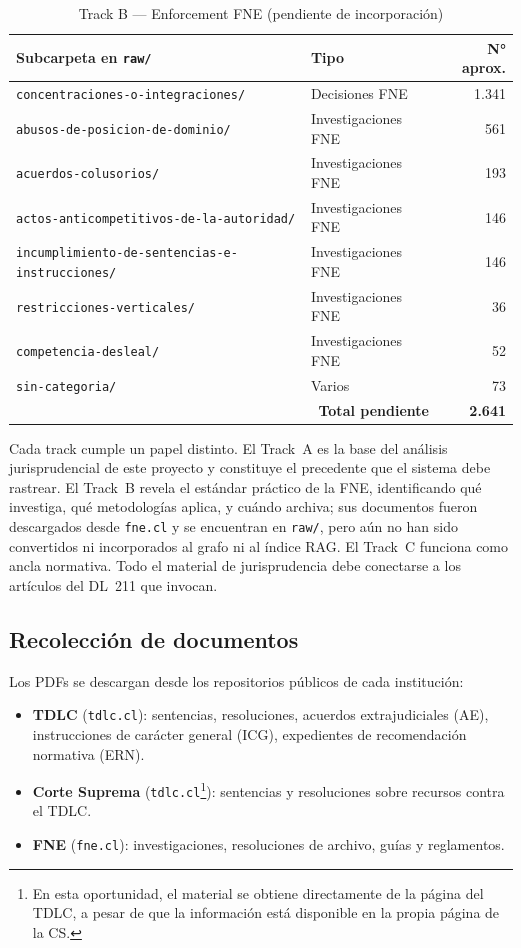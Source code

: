 \documentclass[12pt,a4paper]{article}
\begin{document}
\begin{table}[htbp]
\centering
\caption{Track B — Enforcement FNE (pendiente de incorporación)}
\label{tab:track-b}
\footnotesize
\begin{tabular}{@{}l l r@{}}
\toprule
\rowcolor{tabhead}\color{black}\textbf{Subcarpeta en \texttt{raw/}} &
  \color{black}\textbf{Tipo} &
  \color{black}\textbf{N° aprox.} \\
\midrule
\texttt{concentraciones-o-integraciones/} & Decisiones FNE & 1.341 \\
\texttt{abusos-de-posicion-de-dominio/} & Investigaciones FNE & 561 \\
\texttt{acuerdos-colusorios/} & Investigaciones FNE & 193 \\
\texttt{actos-anticompetitivos-de-la-autoridad/} & Investigaciones FNE & 146 \\
\texttt{incumplimiento-de-sentencias-e-instrucciones/} & Investigaciones FNE & 146 \\
\texttt{restricciones-verticales/} & Investigaciones FNE & 36 \\
\texttt{competencia-desleal/} & Investigaciones FNE & 52 \\
\texttt{sin-categoria/} & Varios & 73 \\
\midrule
\multicolumn{2}{r}{\textbf{Total pendiente}} & \textbf{2.641} \\
\bottomrule
\end{tabular}
\end{table}

Cada track cumple un papel distinto. El Track~A es la base del análisis
jurisprudencial de este proyecto y constituye el precedente que el sistema debe
rastrear. El Track~B revela el estándar práctico de la FNE, identificando qué investiga, qué
metodologías aplica, y cuándo archiva; sus documentos fueron descargados desde
\texttt{fne.cl} y se encuentran en \texttt{raw/}, pero aún no han sido convertidos
ni incorporados al grafo ni al índice RAG. El Track~C funciona como ancla normativa. Todo
el material de jurisprudencia debe conectarse a los artículos del DL~211 que invocan.

\subsection{Recolección de documentos}

Los PDFs se descargan desde los repositorios públicos de cada institución:

\begin{itemize}
  \item \textbf{TDLC} (\texttt{tdlc.cl}): sentencias, resoluciones, acuerdos
    extrajudiciales (AE), instrucciones de carácter general (ICG), expedientes
    de recomendación normativa (ERN).
  \item \textbf{Corte Suprema} (\texttt{tdlc.cl}\footnote{En esta oportunidad, 
  el material se obtiene directamente de la página del TDLC, a pesar de que la información está
  disponible en la propia página de la CS.}): sentencias y resoluciones
    sobre recursos contra el TDLC.
  \item \textbf{FNE} (\texttt{fne.cl}): investigaciones, resoluciones de archivo,
    guías y reglamentos.
\end{itemize}
\end{document}
